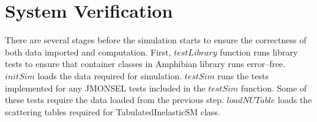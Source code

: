 \chapter{System Verification}\label{sec:verify}
There are several stages before the simulation starts to ensure the correctness of both data imported and computation. First, $testLibrary$ function runs library tests to ensure that container classes in Amphibian library runs error--free. $initSim$ loads the data required for simulation. $testSim$ runs the tests implemented for any JMONSEL tests included in the $testSim$ function. Some of these tests require the data loaded from the previous step. $loadNUTable$ loads the scattering tables required for TabulatedInelasticSM class. 

